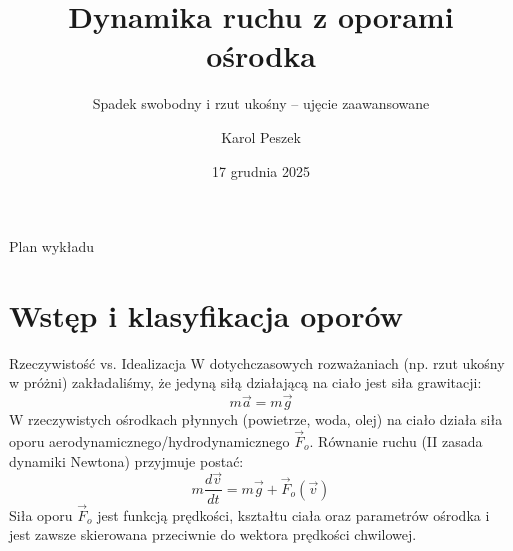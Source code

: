 \documentclass[10pt, aspectratio=43]{beamer}
\title[Dynamika z oporami]{Dynamika ruchu z oporami ośrodka}
\subtitle{Spadek swobodny i rzut ukośny -- ujęcie zaawansowane}
\author{Karol Peszek}
\institute{WFAIS}
\date{17 grudnia 2025}
\begin{document}
\begin{frame}
    \titlepage
\end{frame}

\begin{frame}{Plan wykładu}
    \tableofcontents
\end{frame}

\section{Wstęp i klasyfikacja oporów}

\begin{frame}{Rzeczywistość vs. Idealizacja}
    W dotychczasowych rozważaniach (np. rzut ukośny w próżni) zakładaliśmy, że jedyną siłą działającą na ciało jest siła grawitacji:
    \begin{equation}
        m\vec{a} = m\vec{g}
    \end{equation}
    W rzeczywistych ośrodkach płynnych (powietrze, woda, olej) na ciało działa siła oporu aerodynamicznego/hydrodynamicznego $\vec{F}_o$. Równanie ruchu (II zasada dynamiki Newtona) przyjmuje postać:
    \begin{equation}
        m\frac{d\vec{v}}{dt} = m\vec{g} + \vec{F}_o(\vec{v})
    \end{equation}
    Siła oporu $\vec{F}_o$ jest funkcją prędkości, kształtu ciała oraz parametrów ośrodka i jest zawsze skierowana przeciwnie do wektora prędkości chwilowej.
\end{frame}
\end{document}
